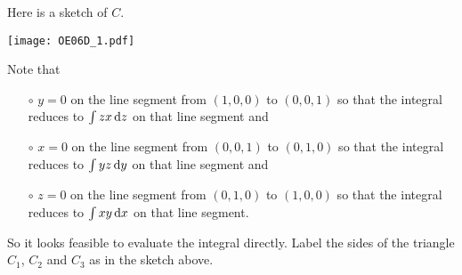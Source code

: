 \begin{solution}
Here is a sketch of $C$.

\begin{center}
       \texttt{[image: OE06D\_1.pdf]}
\end{center}


Note that 
\begin{itemize}\itemsep1pt \parskip0pt  %
\item[$\circ$]
$y=0$ on the line segment from $(1, 0, 0)$ to $(0,0,1)$ so that 
the integral reduces to $\int zx \,\mathrm{d}z$ on that line segment and
\item[$\circ$]
$x=0$ on the line segment from $(0,0,1)$ to $(0, 1, 0)$ so that 
the integral reduces to $\int yz \,\mathrm{d}y$ on that line segment and  
\item[$\circ$]
$z=0$ on the line segment from $(0, 1, 0)$ to  $(1, 0, 0)$ so that 
the integral reduces to $\int xy \,\mathrm{d}x$ on that line segment.
\end{itemize}
So it looks feasible to evaluate the integral directly. 
Label the sides of the triangle $C_1$, $C_2$ and $C_3$ as in the
sketch above.
\end{solution}
